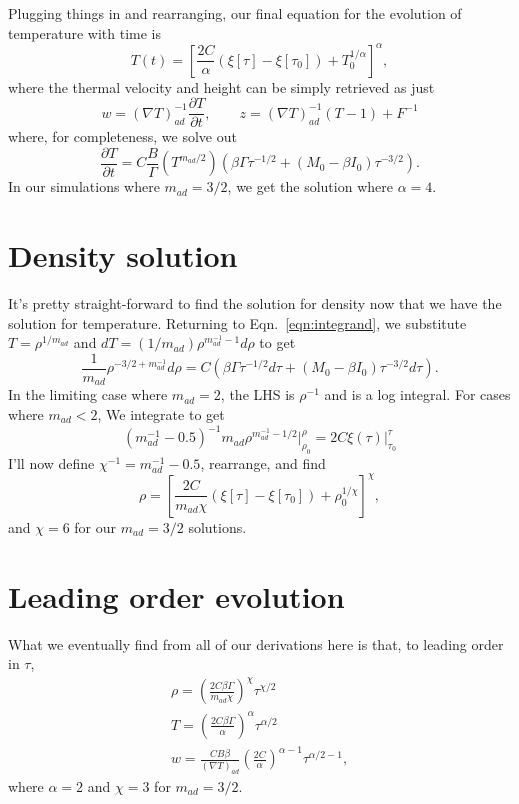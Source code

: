 \documentclass[onecolumn, amsmath, amsfonts, amssymb]{aastex62}
\newcommand{\grad}{\ensuremath{\nabla}}
\begin{document}
Plugging things in and rearranging, our final equation for the evolution of temperature with time
is
\begin{equation}
T(t) = \left[\frac{2C}{\alpha}(\xi[\tau] - \xi[\tau_0])
+ T_0^{1/\alpha}\right]^{\alpha},
\end{equation}
where the thermal velocity and height can be simply retrieved as just
\begin{equation}
w = (\grad T)_{ad}^{-1}\frac{\partial T}{\partial t}, \qquad z = (\grad T)_{ad}^{-1}(T - 1) + F^{-1}
\end{equation}
where, for completeness, we solve out
\begin{equation}
\frac{\partial T}{\partial t} 
= C \frac{B}{\Gamma}( T^{m_{ad}/2} ) \left(\beta\Gamma\tau^{-1/2} + (M_0 - \beta I_0)\tau^{-3/2}\right)
.
\end{equation}
In our simulations where $m_{ad} = 3/2$, we get the solution where $\alpha = 4$.

\section{Density solution}
It's pretty straight-forward to find the solution for density now that we have the solution
for temperature. Returning to Eqn.~\ref{eqn:integrand}, we substitute $T = \rho^{1/m_{ad}}$ and
$dT = (1/m_{ad})\rho^{m_{ad}^{-1} - 1} d\rho$ to get
\begin{equation}
\frac{1}{m_{ad}}\rho^{-3/2 + m_{ad}^{-1}}d\rho = C\left(\beta \Gamma\tau^{-1/2}d\tau + (M_0 - \beta I_0)\tau^{-3/2}d\tau\right).
\end{equation}
In the limiting case where $m_{ad} = 2$, the LHS is $\rho^{-1}$ and is a log integral. For
cases where $m_{ad} < 2$, We integrate to get
\begin{equation}
(m_{ad}^{-1} - 0.5)^{-1}m_{ad}\rho^{m_{ad}^{-1} - 1/2}\bigg|_{\rho_0}^{\rho} = 2 C \xi(\tau)\bigg|_{\tau_0}^{\tau}
\end{equation}
I'll now define $\chi^{-1} = m_{ad}^{-1} - 0.5$, rearrange, and find
\begin{equation}
\rho = \left[\frac{2 C}{m_{ad}\chi}(\xi[\tau] - \xi[\tau_0]) + \rho_0^{1/\chi}\right]^\chi,
\end{equation}
and $\chi = 6$ for our $m_{ad} = 3/2$ solutions.

\section{Leading order evolution}
What we eventually find from all of our derivations here is that, to leading order in $\tau$,
\begin{gather}
\rho = \left(\frac{2 C\beta\Gamma}{m_{ad}\chi}\right)^{\chi} \tau^{\chi/2} \\
T    = \left(\frac{2 C \beta \Gamma}{\alpha}\right)^{\alpha} \tau^{\alpha/2} \\
w    = \frac{C B \beta}{(\grad T)_{ad}}\left(\frac{2 C}{\alpha}\right)^{\alpha - 1} \tau^{\alpha/2 - 1},
\end{gather}
where $\alpha = 2$ and $\chi = 3$ for $m_{ad} = 3/2$.
\end{document}
